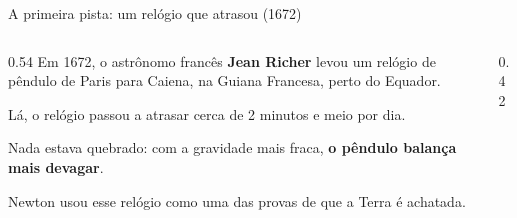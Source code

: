 \documentclass[aspectratio=169,11pt]{beamer}
\newcommand{\bnum}[1]{\textbf{\textcolor{mTeal}{#1}}}
\begin{document}
\begin{frame}{A primeira pista: um relógio que atrasou (1672)}
  \begin{columns}[T]
    \begin{column}{0.54\textwidth}
      Em 1672, o astrônomo francês \textbf{Jean Richer} levou um relógio de pêndulo de
      Paris para Caiena, na Guiana Francesa, perto do Equador.
      \medskip

      Lá, o relógio passou a atrasar cerca de \alert{2 minutos e meio por dia}.
      \medskip

      Nada estava quebrado: com a gravidade mais fraca, \bnum{o pêndulo balança mais
      devagar}.
      \medskip

      Newton usou esse relógio como uma das provas de que a Terra é achatada.
    \end{column}
    \begin{column}{0.42\textwidth}
      \centering
    \end{column}
  \end{columns}
\end{frame}
\end{document}
